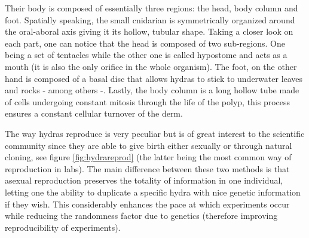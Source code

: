Their body is composed of essentially three regions: the head, body column and foot. Spatially speaking, the small cnidarian is symmetrically organized around the oral-aboral axis giving it its hollow, tubular shape. Taking a closer look on each part, one can notice that the head is composed of two sub-regions. One being a set of tentacles while the other one is called hypostome and acts as a mouth (it is also the only orifice in the whole organism). The foot, on the other hand is composed of a basal disc that allows hydras to stick to underwater leaves and rocks - among others -. Lastly, the body column is a long hollow tube made of cells undergoing constant mitosis through the life of the polyp, this process ensures a constant cellular turnover of the derm.

\begin{remark}
	The way hydras reproduce is very peculiar but is of great interest to the scientific community since they are able to give birth either sexually or through natural cloning, see figure \ref{fig:hydrareprod} (the latter being the most common way of reproduction in labs). The main difference between these two methods is that asexual reproduction preserves the totality of information in one individual, letting one the ability to duplicate a specific hydra with nice genetic information if they wish. This considerably enhances the pace at which experiments occur while reducing the randomness factor due to genetics (therefore improving reproducibility of experiments). 
\end{remark}


